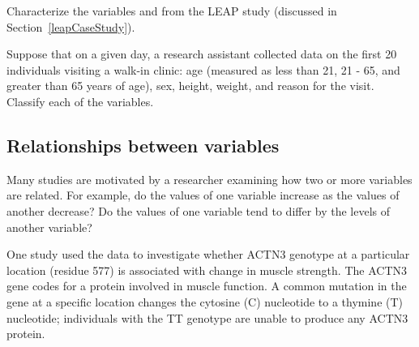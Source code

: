 \begin{exercisewrap}
\begin{nexercise} 
	Characterize the variables  and  from the LEAP study (discussed in Section~\ref{leapCaseStudy}).\footnotemark{}
\end{nexercise}
\end{exercisewrap}

\begin{exercisewrap}
\begin{nexercise}
Suppose that on a given day, a research assistant collected data on the first 20 individuals visiting a walk-in clinic: age (measured as less than 21, 21 - 65, and greater than 65 years of age), sex, height, weight, and reason for the visit.  Classify each of the variables.\footnotemark{}
\end{nexercise}
\end{exercisewrap}


\textD{\newpage}


\subsection{Relationships between variables}
\label{variableRelations}

Many studies are motivated by a researcher examining how two or more variables are related. For example, do the values of one variable increase as the values of another decrease? Do the values of one variable tend to differ by the levels of another variable?

One study used the  data to investigate whether ACTN3 genotype at a particular location (residue 577) is associated with change in muscle strength. The ACTN3 gene codes for a protein involved in muscle function. A common mutation in the gene at a specific location changes the cytosine (C) nucleotide to a thymine (T) nucleotide; individuals with the TT genotype are unable to produce any ACTN3 protein. 

